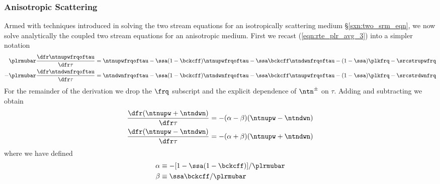 \documentclass[12pt]{article}
\begin{document}
\subsubsection[Anisotropic Scattering]{Anisotropic Scattering}\label{sxn:two_srm_asm_sct} 
Armed with techniques introduced in solving the two stream equations 
for an isotropically scattering medium \S\ref{sxn:two_srm_eqn},  
we now solve analytically the coupled two stream equations for
an anisotropic medium.
First we recast (\ref{eqn:rte_plr_avg_3}) into a simpler notation 
\begin{subequations}
\label{eqn:two_str_asm_apx}
\begin{align}
\label{eqn:two_str_asm_apx_upw}
\plrmubar \frac{\dfr\ntnupwfrqoftau}{\dfr\tau} & =  
\ntnupwfrqoftau - \ssa (1 - \bckcff) \ntnupwfrqoftau 
- \ssa \bckcff \ntndwnfrqoftau  - (1-\ssa) \plkfrq - \srcstrupwfrq \\
\label{eqn:two_str_asm_apx_dwn}
- \plrmubar \frac{\dfr\ntndwnfrqoftau}{\dfr\tau} & =  
\ntndwnfrqoftau - \ssa (1 - \bckcff) \ntndwnfrqoftau 
- \ssa \bckcff \ntnupwfrqoftau  - (1-\ssa) \plkfrq - \srcstrdwnfrq
\end{align}
\end{subequations} 
For the remainder of the derivation we drop the $\frq$
subscript and the explicit dependence of $\ntn^{\pm}$ on $\tau$.
Adding and subtracting we obtain
\begin{subequations}
\label{eqn:two_str_asm_abb}
\begin{align}
\label{eqn:two_str_asm_pls}
\frac{\dfr(\ntnupw + \ntndwn)}{\dfr\tau} & =  
-(\alpha - \beta) (\ntnupw - \ntndwn) \\
\label{eqn:two_str_asm_mns}
\frac{\dfr(\ntnupw - \ntndwn)}{\dfr\tau} & =  
-(\alpha + \beta) (\ntnupw + \ntndwn)
\end{align}
\end{subequations} 
where we have defined 
\begin{subequations}
\label{eqn:two_str_asm_abb}
\begin{align}
\label{eqn:two_str_asm_alpha}
\alpha & \equiv -[ 1 - \ssa ( 1 - \bckcff ) ] / \plrmubar \\
\label{eqn:two_str_asm_beta}
\beta & \equiv \ssa \bckcff / \plrmubar
\end{align}
\end{subequations} 
\end{document}
